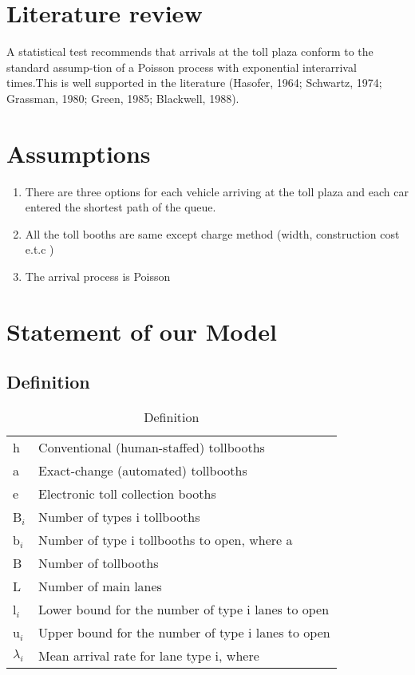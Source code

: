 \documentclass{mcmthesis}
\begin{document}
\section{Literature review}

         A statistical test recommends that arrivals at the toll plaza conform to the standard assump-tion of a Poisson process with exponential interarrival times.This is well supported in the literature (Hasofer, 1964; Schwartz, 1974; Grassman, 1980; Green, 1985; Blackwell, 1988).


    \section{Assumptions}
        \begin{enumerate}
          \item There are three options for each vehicle arriving at the toll plaza and each car entered the shortest path of the queue.
          \item All the toll booths are same except charge method (width, construction cost e.t.c )
          \item The arrival process is Poisson
        \end{enumerate}


\section{Statement of our Model}

    \subsection{Definition}
        \begin{table}
          \centering
                \begin{tabular}{ll}
                \hline
                h  &  Conventional (human-staffed) tollbooths \\
                a  &  Exact-change (automated) tollbooths \\
                e  &  Electronic toll collection booths \\
                B$_{i}$  &  Number of types i tollbooths \\
                b$_{i}$  &  Number of type i tollbooths to open, where a \\
                B  &  Number of tollbooths \\
                L  &  Number of main lanes \\
                l$_{i}$  &  Lower bound for the number of type i lanes to open \\
                u$_{i}$  &  Upper bound for the number of type i lanes to open \\
                $\lambda _{i}$ & Mean arrival rate for lane type i, where \\
                \hline
                \end{tabular}
            \caption{Definition}
        \end{table}
\end{document}
